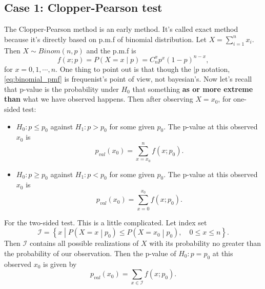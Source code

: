 \documentclass[a4paper,12pt]{article}
\begin{document}
\subsection{Case 1: Clopper-Pearson test}
\label{sec:case-1:-clopper}

The Clopper-Pearson method is an early method. It's called exact method because it's directly based on p.m.f of binomial distribution. Let $X = \sum\limits_{i = 1}^nx_i$. Then $X\sim Binom(n, p)$ and the p.m.f is
\begin{equation}
  \label{eq:binomial_pmf}
  f\left(x;p\right) = P\left(X = x\middle|p\right) = C_n^xp^x\left(1 - p\right)^{n - x}
  ,
\end{equation}
for $x = 0, 1, \cdots, n$. One thing to point out is that though the $|p$ notation, \eqref{eq:binomial_pmf} is frequenist's point of view, not bayesian's. Now let's recall that p-value is the probability under $H_0$ that something \textbf{as or more extreme than} what we have observed happens. Then after observing $X = x_0$, for one-sided test:
\begin{itemize}
\item $H_0: p \leq p_0$ against $H_1: p > p_0$ for some given $p_0$. The p-value at this observed $x_0$ is
  \begin{equation}
    \label{eq:clopper_pval_h0_leq}
    p_{val}\left(x_0\right) = \sum\limits_{x = x_0}^nf\left(x;p_0\right)
    .
  \end{equation}

\item $H_0: p \geq p_0$ against $H_1: p < p_0$ for some given $p_0$. The p-value at this observed $x_0$  is
  \begin{equation}
    \label{eq:clopper_pval_h0_geq}
    p_{val}\left(x_0\right) = \sum\limits_{x = 0}^{x_0}f\left(x;p_0\right)
    .    
  \end{equation}

\end{itemize}
For the two-sided test. This is a little complicated. Let index set
\[
  \mathcal{I} = \left\{
    x\middle|
    P\left(X = x\middle|p_0\right) \leq P\left(X = x_0\middle|p_0\right)
    ,\quad
    0\leq x \leq n
  \right\}
  .
\]
Then $\mathcal{I}$ contains all possible realizations of $X$ with its probability no greater than the probability of our observation. Then the p-value of $H_0: p = p_0$  at this observed $x_0$ is given by
\begin{equation}
  \label{eq:clopper_pval_h0_twosided}
  p_{val}\left(x_0\right) = \sum\limits_{x\in\mathcal{I}}f\left(x;p_0\right)
  . 
\end{equation}
\end{document}
